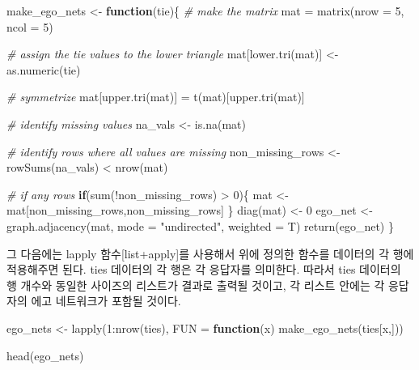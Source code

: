 \documentclass[
]{book}
\newenvironment{Shaded}{\begin{snugshade}}{\end{snugshade}}
\newcommand{\AttributeTok}[1]{\textcolor[rgb]{0.77,0.63,0.00}{#1}}
\newcommand{\CommentTok}[1]{\textcolor[rgb]{0.56,0.35,0.01}{\textit{#1}}}
\newcommand{\ControlFlowTok}[1]{\textcolor[rgb]{0.13,0.29,0.53}{\textbf{#1}}}
\newcommand{\DecValTok}[1]{\textcolor[rgb]{0.00,0.00,0.81}{#1}}
\newcommand{\FunctionTok}[1]{\textcolor[rgb]{0.00,0.00,0.00}{#1}}
\newcommand{\NormalTok}[1]{#1}
\newcommand{\OtherTok}[1]{\textcolor[rgb]{0.56,0.35,0.01}{#1}}
\newcommand{\SpecialCharTok}[1]{\textcolor[rgb]{0.00,0.00,0.00}{#1}}
\newcommand{\StringTok}[1]{\textcolor[rgb]{0.31,0.60,0.02}{#1}}
\begin{document}
\begin{Shaded}
\begin{Highlighting}[]
\NormalTok{make\_ego\_nets }\OtherTok{\textless{}{-}} \ControlFlowTok{function}\NormalTok{(tie)\{}
  \CommentTok{\# make the matrix}
\NormalTok{  mat }\OtherTok{=} \FunctionTok{matrix}\NormalTok{(}\AttributeTok{nrow =} \DecValTok{5}\NormalTok{, }\AttributeTok{ncol =} \DecValTok{5}\NormalTok{)}
  
  \CommentTok{\# assign the tie values to the lower triangle}
\NormalTok{  mat[}\FunctionTok{lower.tri}\NormalTok{(mat)] }\OtherTok{\textless{}{-}} \FunctionTok{as.numeric}\NormalTok{(tie)}
  
  \CommentTok{\# symmetrize}
\NormalTok{  mat[}\FunctionTok{upper.tri}\NormalTok{(mat)] }\OtherTok{=} \FunctionTok{t}\NormalTok{(mat)[}\FunctionTok{upper.tri}\NormalTok{(mat)]}
  
  \CommentTok{\# identify missing values}
\NormalTok{  na\_vals }\OtherTok{\textless{}{-}} \FunctionTok{is.na}\NormalTok{(mat)}
  
  \CommentTok{\# identify rows where all values are missing}
\NormalTok{  non\_missing\_rows }\OtherTok{\textless{}{-}} \FunctionTok{rowSums}\NormalTok{(na\_vals) }\SpecialCharTok{\textless{}} \FunctionTok{nrow}\NormalTok{(mat)}
  
  \CommentTok{\# if any rows }
  \ControlFlowTok{if}\NormalTok{(}\FunctionTok{sum}\NormalTok{(}\SpecialCharTok{!}\NormalTok{non\_missing\_rows) }\SpecialCharTok{\textgreater{}} \DecValTok{0}\NormalTok{)\{}
\NormalTok{    mat }\OtherTok{\textless{}{-}}\NormalTok{ mat[non\_missing\_rows,non\_missing\_rows]}
\NormalTok{  \}}
  \FunctionTok{diag}\NormalTok{(mat) }\OtherTok{\textless{}{-}} \DecValTok{0}
\NormalTok{  ego\_net }\OtherTok{\textless{}{-}} \FunctionTok{graph.adjacency}\NormalTok{(mat, }\AttributeTok{mode =} \StringTok{"undirected"}\NormalTok{, }\AttributeTok{weighted =}\NormalTok{ T)}
  \FunctionTok{return}\NormalTok{(ego\_net)}
\NormalTok{\}}
\end{Highlighting}
\end{Shaded}

그 다음에는 lapply 함수{[}list+apply{]}를 사용해서 위에 정의한 함수를 데이터의 각 행에 적용해주면 된다. ties 데이터의 각 행은 각 응답자를 의미한다. 따라서 ties 데이터의 행 개수와 동일한 사이즈의 리스트가 결과로 출력될 것이고, 각 리스트 안에는 각 응답자의 에고 네트워크가 포함될 것이다.

\begin{Shaded}
\begin{Highlighting}[]
\NormalTok{ego\_nets }\OtherTok{\textless{}{-}} \FunctionTok{lapply}\NormalTok{(}\DecValTok{1}\SpecialCharTok{:}\FunctionTok{nrow}\NormalTok{(ties), }
                   \AttributeTok{FUN =} \ControlFlowTok{function}\NormalTok{(x) }\FunctionTok{make\_ego\_nets}\NormalTok{(ties[x,]))}

\FunctionTok{head}\NormalTok{(ego\_nets)}
\end{Highlighting}
\end{Shaded}
\end{document}
